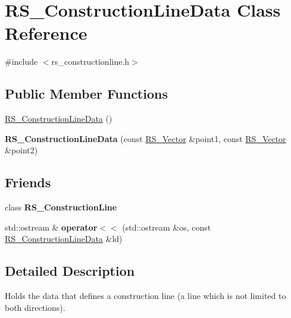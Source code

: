 \hypertarget{classRS__ConstructionLineData}{\section{R\-S\-\_\-\-Construction\-Line\-Data Class Reference}
\label{classRS__ConstructionLineData}
}


{\ttfamily \#include $<$rs\-\_\-constructionline.\-h$>$}

\subsection*{Public Member Functions}
\begin{DoxyCompactItemize}
\item 
\hyperlink{classRS__ConstructionLineData_ad8d4c2a766ee2b6a0e3f59a187c312c8}{R\-S\-\_\-\-Construction\-Line\-Data} ()
\item 
\hypertarget{classRS__ConstructionLineData_af96c91ce41dbb64d177f5df28fc4f106}{{\bfseries R\-S\-\_\-\-Construction\-Line\-Data} (const \hyperlink{classRS__Vector}{R\-S\-\_\-\-Vector} \&point1, const \hyperlink{classRS__Vector}{R\-S\-\_\-\-Vector} \&point2)}\label{classRS__ConstructionLineData_af96c91ce41dbb64d177f5df28fc4f106}

\end{DoxyCompactItemize}
\subsection*{Friends}
\begin{DoxyCompactItemize}
\item 
\hypertarget{classRS__ConstructionLineData_a729e968eede48cb5d0bbc17530b4f8fe}{class {\bfseries R\-S\-\_\-\-Construction\-Line}}\label{classRS__ConstructionLineData_a729e968eede48cb5d0bbc17530b4f8fe}

\item 
\hypertarget{classRS__ConstructionLineData_a18ec856fda168381194e1a64bdd2faff}{std\-::ostream \& {\bfseries operator$<$$<$} (std\-::ostream \&os, const \hyperlink{classRS__ConstructionLineData}{R\-S\-\_\-\-Construction\-Line\-Data} \&ld)}\label{classRS__ConstructionLineData_a18ec856fda168381194e1a64bdd2faff}

\end{DoxyCompactItemize}


\subsection{Detailed Description}
Holds the data that defines a construction line (a line which is not limited to both directions). 

